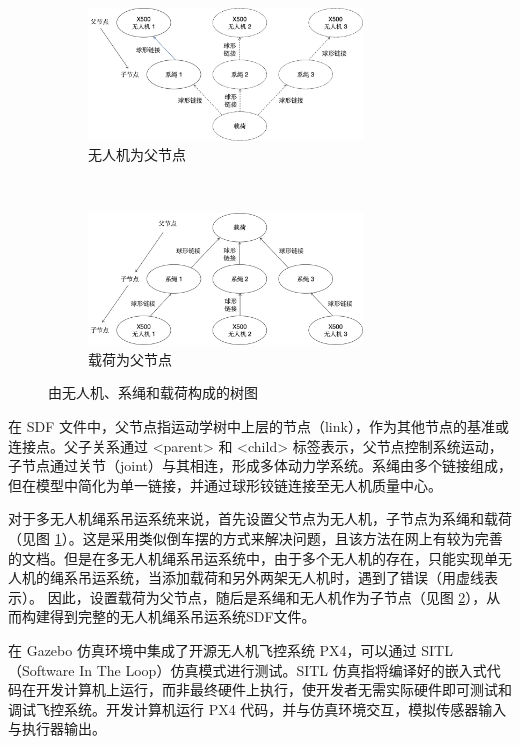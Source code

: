 \documentclass[lang=chs, degree=master, blindreview=false, winfonts=true]{yanputhesis}
\begin{document}
\begin{figure}[hbt!]
	\centering
	\begin{subfigure}[t]{0.9\textwidth}
		\centering
		\includegraphics[width=0.8\textwidth]{picture/tree2.png}
		\caption{无人机为父节点}
		\label{tree1}
	\end{subfigure}\\[2ex] %
	\begin{subfigure}[t]{0.9\textwidth}
		\centering
		\includegraphics[width=0.8\textwidth]{picture/tree1.png}
		\caption{载荷为父节点}
		\label{tree2}
	\end{subfigure}
	\caption{由无人机、系绳和载荷构成的树图}
	\label{tree_combined}
\end{figure}
在 SDF 文件中，父节点指运动学树中上层的节点（link），作为其他节点的基准或连接点。父子关系通过 <parent> 和 <child> 标签表示，父节点控制系统运动，子节点通过关节（joint）与其相连，形成多体动力学系统。系绳由多个链接组成，但在模型中简化为单一链接，并通过球形铰链连接至无人机质量中心。

对于多无人机绳系吊运系统来说，首先设置父节点为无人机，子节点为系绳和载荷（见图 \ref{tree1}）。这是采用类似倒车摆的方式来解决问题，且该方法在网上有较为完善的文档。但是在多无人机绳系吊运系统中，由于多个无人机的存在，只能实现单无人机的绳系吊运系统，当添加载荷和另外两架无人机时，遇到了错误（用虚线表示）。
因此，设置载荷为父节点，随后是系绳和无人机作为子节点（见图 \ref{tree2}），从而构建得到完整的无人机绳系吊运系统SDF文件。

在 Gazebo 仿真环境中集成了开源无人机飞控系统 PX4，可以通过 SITL（Software In The Loop）仿真模式进行测试。SITL 仿真指将编译好的嵌入式代码在开发计算机上运行，而非最终硬件上执行，使开发者无需实际硬件即可测试和调试飞控系统。开发计算机运行 PX4 代码，并与仿真环境交互，模拟传感器输入与执行器输出。
\end{document}
